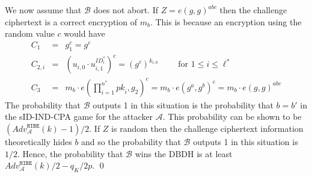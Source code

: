 \documentclass[10pt]{llncs}
\newcommand{\A}{\mathcal{A}}
\newcommand{\B}{\mathcal{B}}
\newcommand{\ID}{\mathit{ID}}
\newcommand{\pk}{\mathit{pk}}
\newcommand{\adv}[2]{\mathit{Adv}_{#1}^{\texttt{#2}}}
\begin{document}
We now assume that $\B$ does not abort. If $Z=e(g,g)^{abc}$ then the
challenge ciphertext is a correct encryption of $m_{b}$. This is
because an encryption using the random value $c$ would have
\begin{eqnarray*}
C_{1} &=& g_{1}^{c}=g^{c}\\
C_{2,i} &=& (u_{i,0} \cdot u_{i,1}^{\ID^{*}_{i}})^{c} = (g^{c})^{k_{i,0}} \qquad \mbox{ for } 1\leq i\leq \ell^{*}\\
C_{3} &=& m_{b} \cdot e(\prod_{i=1}^{n^{*}} \pk_i,g_{2})^{c}
= m_{b} \cdot e(g^{a},g^{b})^{c} = m_{b} \cdot e(g,g)^{abc}
\end{eqnarray*}
The probability that $\B$ outputs 1 in this situation is the
probability that $b=b'$ in the sID-IND-CPA game for the attacker
$\A$. This probability can be shown to be $(\adv{\A}{HIBE}(k)-1)/2$.
If $Z$ is random then the challenge ciphertext information
theoretically hides $b$ and so the probability that $\B$ outputs 1
in this situation is $1/2$. Hence, the probability that $\B$ wins
the DBDH is at least $\adv{\A}{HIBE}(k)/2-q_{K}/2p$. \qed
\end{document}
